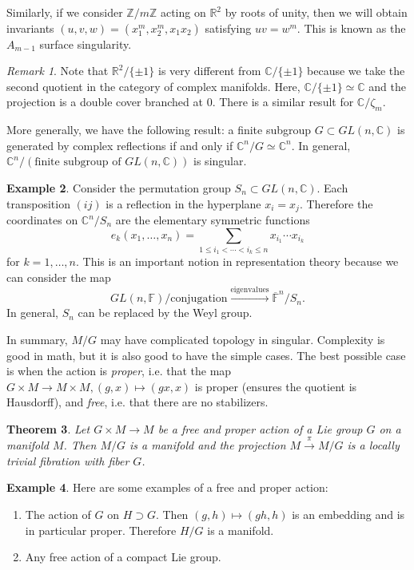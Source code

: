 \documentclass[leqno, openany]{memoir}
\newtheorem{thm}{Theorem}[section]
\theoremstyle{definition}
\newtheorem{exm}[thm]{Example}
\theoremstyle{remark}
\newtheorem{rmk}[thm]{Remark}
\theoremstyle{plain}
\theoremstyle{definition}
\theoremstyle{remark}
\newcommand{\F}{\mathbb{F}}
\newcommand{\R}{\mathbb{R}}
\newcommand{\C}{\mathbb{C}}
\newcommand{\Z}{\mathbb{Z}}
\newcommand{\ol}[1]{\overline{#1}}
\begin{document}
Similarly, if we consider $\Z/m\Z$ acting on $\R^2$  by roots of unity, then we will obtain invariants $(u,v,w) = (x_1^m, x_2^m, x_1x_2)$ satisfying $uv = w^m$. This is known as the $A_{m-1}$ surface singularity.

\begin{rmk}
    Note that $\R^2 / \{ \pm 1 \}$ is very different from $\C / \{ \pm 1 \}$ because we take the second quotient in the category of complex manifolds. Here, $\C / \{ \pm 1 \} \simeq \C$ and the projection is a double cover branched at $0$. There is a similar result for $\C / \zeta_m$. 

    More generally, we have the following result: a finite subgroup $G \subset GL(n,\C)$ is generated by complex reflections if and only if $\C^n / G \simeq \C^n$. In general, $\C^n / (\text{finite subgroup of }GL(n,\C))$ is singular.
\end{rmk}

\begin{exm}
    Consider the permutation group $S_n \subset GL(n,\C)$. Each transposition $(ij)$ is a reflection in the hyperplane $x_i = x_j$. Therefore the coordinates on $\C^n / S_n$ are the elementary symmetric functions
    \[ e_k(x_1, \ldots, x_n) = \sum_{1 \leq i_1 < \cdots < i_k \leq n} x_{i_1} \cdots x_{i_k} \]
    for $k = 1, \ldots, n$. This is an important notion in representation theory because we can consider the map
    \[ GL(n, \F) / \text{conjugation} \xrightarrow{\text{eigenvalues}} \ol{\F}^n / S_n. \]
    In general, $S_n$ can be replaced by the Weyl group.
\end{exm}

In summary, $M/G$ may have complicated topology in singular. Complexity is good in math, but it is also good to have the simple cases. The best possible case is when the action is \textit{proper}, i.e. that the map $G \times M \to M \times M, (g,x) \mapsto (gx,x)$ is proper (ensures the quotient is Hausdorff), and \textit{free}, i.e. that there are no stabilizers.

\begin{thm}
    \label{thm:freeproper}
    Let $G \times M \to M$ be a free and proper action of a Lie group $G$ on a manifold $M$. Then $M/G$ is a manifold and the projection $M \xrightarrow{\pi} M/G$ is a locally trivial fibration with fiber $G$.
\end{thm}

\begin{exm}
    Here are some examples of a free and proper action:
    \begin{enumerate}
        \item The action of $G$ on $H \supset G$. Then $(g,h) \mapsto (gh,h)$ is an embedding and is in particular proper. Therefore $H/G$ is a manifold.
        \item Any free action of a compact Lie group.
    \end{enumerate}
\end{exm}
\end{document}
